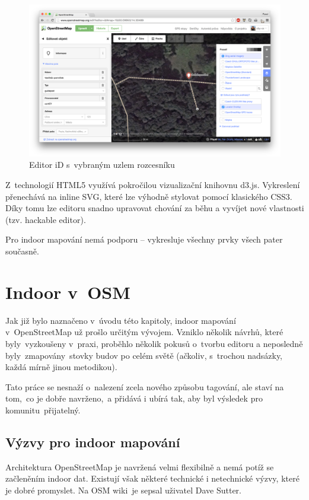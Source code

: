  \begin{figure}
	  \centering
      \includegraphics[width=\textwidth]{img/25-editor-id.png}
      \caption{Editor iD s~vybraným uzlem rozcesníku}
      \label{obr25}
  \end{figure}

Z~technologií HTML5 využívá pokročilou vizualizační knihovnu d3.js. Vykreslení přenechává na inline SVG, které lze výhodně stylovat pomocí klasického CSS3. Díky tomu lze editoru snadno upravovat chování za běhu a vyvíjet nové vlastnosti (tzv. hackable editor).

Pro indoor mapování nemá podporu -- vykresluje všechny prvky všech pater současně.

\section{Indoor v~OSM}\label{indoor-v-osm}

Jak již bylo naznačeno v~úvodu této kapitoly, indoor mapování v~OpenStreetMap už prošlo určitým vývojem. Vzniklo několik návrhů, které byly~vyzkoušeny v~praxi, proběhlo několik pokusů o~tvorbu editoru a neposledně byly~zmapovány~stovky budov po celém světě (ačkoliv, s~trochou nadsázky, každá mírně jinou metodikou).

Tato práce se nesnaží o~nalezení zcela nového způsobu tagování, ale staví na tom,~co je dobře navrženo,~a přidává i ubírá tak, aby byl výsledek pro komunitu~přijatelný.

\subsection{Výzvy pro indoor mapování}\label{vuxfdzvy-pro-indoor-mapovuxe1nuxed}

Architektura OpenStreetMap je navržená velmi flexibilně a nemá potíž se začleněním indoor dat. Existují však některé technické i netechnické výzvy, které je dobré promyslet. Na OSM wiki\cite{zdroj46}~je sepsal uživatel Dave Sutter.

